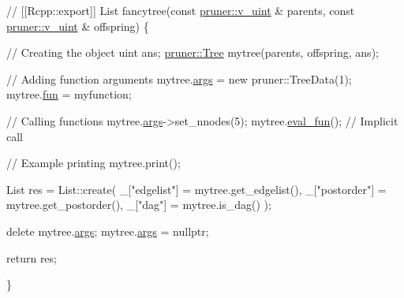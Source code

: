 \begin{DoxyCodeInclude}
{{{{\textcolor{comment}{// [[Rcpp::export]]}
List fancytree(\textcolor{keyword}{const} \hyperlink{namespacepruner_af0145646bd7ede012cd336b416bc5579}{pruner::v\_uint} & parents, \textcolor{keyword}{const} 
      \hyperlink{namespacepruner_af0145646bd7ede012cd336b416bc5579}{pruner::v\_uint} & offspring) \{
  
  \textcolor{comment}{// Creating the object}
  uint ans;
  \hyperlink{classpruner_1_1Tree}{pruner::Tree} mytree(parents, offspring, ans);
  
  \textcolor{comment}{// Adding function arguments}
  mytree.\hyperlink{classpruner_1_1Tree_afe84a58af72b0d544dcc7ceff96daf8d}{args} = \textcolor{keyword}{new} pruner::TreeData(1);
  mytree.\hyperlink{classpruner_1_1Tree_a243f4077cc9974d6de6a6af0f3e9b0fd}{fun} = myfunction;
  
  \textcolor{comment}{// Calling functions}
  mytree.\hyperlink{classpruner_1_1Tree_afe84a58af72b0d544dcc7ceff96daf8d}{args}->set\_nnodes(5);
  mytree.\hyperlink{classpruner_1_1Tree_abaa9ef6d7eacf37302d29c12c2180c3a}{eval\_fun}();   \textcolor{comment}{// Implicit call}
  
  \textcolor{comment}{// Example printing}
  mytree.print();
  
  List res = List::create(
    \_[\textcolor{stringliteral}{"edgelist"}]  = mytree.get\_edgelist(),
    \_[\textcolor{stringliteral}{"postorder"}] = mytree.get\_postorder(),
    \_[\textcolor{stringliteral}{"dag"}]       = mytree.is\_dag()
  );
  
  \textcolor{keyword}{delete} mytree.\hyperlink{classpruner_1_1Tree_afe84a58af72b0d544dcc7ceff96daf8d}{args};
  mytree.\hyperlink{classpruner_1_1Tree_afe84a58af72b0d544dcc7ceff96daf8d}{args} = \textcolor{keyword}{nullptr};
  
  \textcolor{keywordflow}{return} res;
  
\}

}}}}
\end{DoxyCodeInclude}
